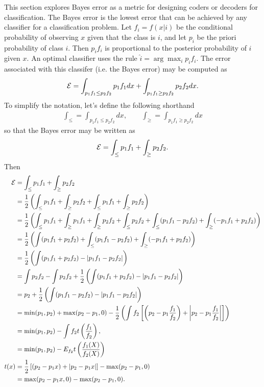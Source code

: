 \documentclass{article}
\begin{document}
This section explores Bayes error as a metric for designing coders or decoders for classification.  The Bayes error is the lowest error that can be achieved by any classifier for a classification problem.  Let $f_i = f(x|i)$ be the conditional probability of observing $x$ given that the class is $i$, and let $p_i$ be the priori probability of class $i$.  Then $p_if_i$ is proportional to the posterior probability of $i$ given $x$.  An optimal classifier uses the rule $\hat{i} = \arg\max_i p_i f_i$.  The error associated with this classifer (i.e. the Bayes error) may be computed as
\begin{gather*}
{\cal E} = \int_{p_1 f_1 \leq p_2 f_2} p_1 f_1 dx + \int_{p_1 f_1 \geq p_2 f_2} p_2 f_2 dx. 
\end{gather*}
To simplify the notation, let's define the following shorthand
\begin{gather*}
\int_\leq = \int_{p_1 f_1 \leq p_2 f_2} dx, \qquad \int_\geq = \int_{p_1 f_1 \geq p_2 f_2} dx
\end{gather*}
so that the Bayes error may be written as
\begin{gather*}
{\cal E} = \int_\leq p_1 f_1 + \int_\geq p_2 f_2.
\end{gather*}
Then
\begin{align*}
{\cal E} &= \int_\leq p_1 f_1 + \int_\geq p_2 f_2 \\
&= \frac{1}{2} \left( \int_\leq p_1 f_1 + \int_\geq p_2 f_2 + \int_\leq p_1 f_1 + \int_\geq p_2 f_2 \right) \\
&= \frac{1}{2} \left( \int_\leq p_1 f_1 + \int_\geq p_1 f_1 + \int_\geq p_2 f_2 + \int_\leq p_2f_2 + \int_\leq (p_1 f_1 - p_2f_2) + \int_\geq (- p_1 f_1 + p_2 f_2) \right) \\
&= \frac{1}{2} \left( \int (p_1 f_1 + p_2 f_2) + \int_\leq (p_1 f_1 - p_2f_2) + \int_\geq (- p_1 f_1 + p_2 f_2) \right) \\
&= \frac{1}{2} \left( \int (p_1 f_1 + p_2 f_2) - |p_1 f_1 - p_2f_2| \right) \\
&= \int p_2 f_2 - \int p_2 f_2 + \frac{1}{2} \left( \int (p_1 f_1 + p_2 f_2) - |p_1 f_1 - p_2f_2| \right) \\
&= p_2 + \frac{1}{2} \left( \int (p_1 f_1 - p_2 f_2) - |p_1 f_1 - p_2f_2| \right) \\
&= \min(p_1,p_2) + \max(p_2-p_1,0) - \frac{1}{2} \left( \int f_2 \left[\left(p_2 - p_1 \frac{f_1}{f_2}\right) + \left|p_2 - p_1\frac{f_1}{f_2}\right| \right]\right) \\
&= \min(p_1,p_2) - \int f_2t\left(\frac{f_1}{f_2}\right), \\
&= \min(p_1,p_2) - E_{f_2} t\left(\frac{f_1(X)}{f_2(X)}\right) \\
t(x) &= \frac{1}{2} \left[ (p_2-p_1 x) + |p_2 - p_1 x|\right] - \max(p_2-p_1,0) \\
&= \max(p_2-p_1x,0) - \max(p_2-p_1,0).
\end{align*}
\end{document}
